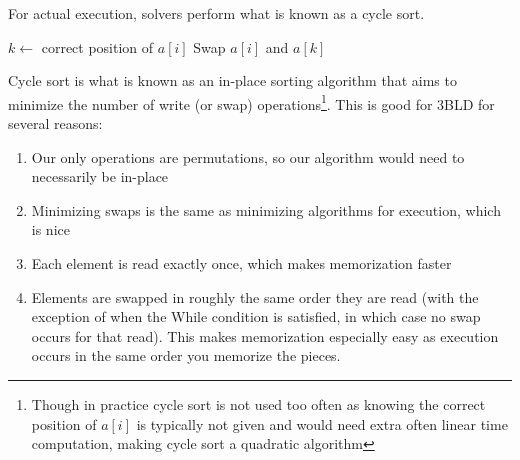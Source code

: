\documentclass{article}
\begin{document}
For actual execution, solvers perform what is known as a cycle sort.
\begin{algorithm}[h]
    \begin{algorithmic}
                \State $k\gets$ correct position of $a[i]$
                \State Swap $a[i]$ and $a[k]$
            \EndWhile
        \EndFor
    \EndFunction
    \end{algorithmic}
\end{algorithm}
Cycle sort is what is known as an in-place sorting algorithm that aims to minimize the number of write (or swap) operations\footnote{Though in practice cycle sort is not used too often as knowing the correct position of $a[i]$ is typically not given and would need extra often linear time computation, making cycle sort a quadratic algorithm}. This is good for 3BLD for several reasons:
\begin{enumerate}
    \item Our only operations are permutations, so our algorithm would need to necessarily be in-place
    \item Minimizing swaps is the same as minimizing algorithms for execution, which is nice
    \item Each element is read exactly once, which makes memorization faster
    \item Elements are swapped in roughly the same order they are read (with the exception of when the While condition is satisfied, in which case no swap occurs for that read). This makes memorization especially easy as execution occurs in the same order you memorize the pieces.
\end{enumerate}
\end{document}
